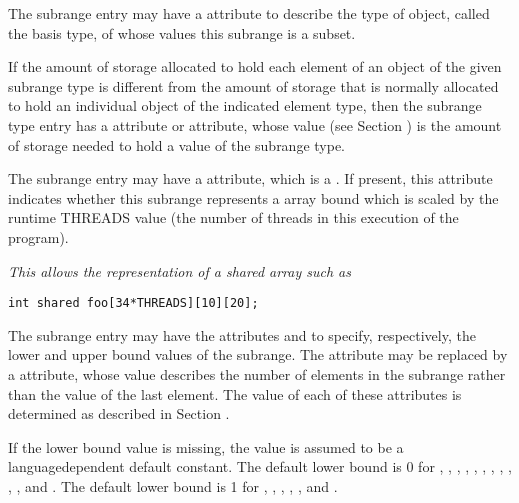 The subrange entry may have 
a \DWATtype{} attribute to describe
the type of object, called the basis type, of whose values
this subrange is a subset.

If the amount of storage allocated to hold each element of an
object of the given subrange type is different from the amount
of storage that is normally allocated to hold an individual
object of the indicated element type, then the subrange
type entry has a 
\DWATbytesize{} attribute or 
\DWATbitsize{}
attribute, whose value 
(see Section )
is the amount of
storage needed to hold a value of the subrange type.

The 
\hypertarget{chap:DWATthreadsscaledupcarrayboundthreadsscalfactor}{}
subrange entry may have 
a 
\DWATthreadsscaled{} attribute,
which is a . 
If present, this attribute indicates whether
this subrange represents a  array bound which is scaled
by the runtime THREADS value (the number of  threads in
this execution of the program).

\textit{This allows the representation of a  shared array such as}

\begin{lstlisting}[numbers=none]
int shared foo[34*THREADS][10][20];
\end{lstlisting}

The 
\hypertarget{chap:DWATlowerboundlowerboundofsubrange}{}
subrange 
\hypertarget{chap:DWATupperboundupperboundofsubrange}{}
entry may have the attributes 
\DWATlowerbound{}
and \DWATupperbound{}
 to specify, respectively, the lower
and upper bound values of the subrange. The 
\DWATupperbound{}
attribute 
\hypertarget{chap:DWATcountelementsofsubrangetype}{}
may 
be 
replaced by a 
\DWATcount{} attribute, 
whose
value describes the number of elements in the subrange rather
than the value of the last element. The value of each of
these attributes is determined as described in 
Section .

If the lower bound value is missing, the value is assumed to
be a language\dash dependent default constant. 
The default lower bound is 0 for 
, 
, 
,
,
, 
, 
, 
,
,
, 
, and 
. 
The default lower bound is 1 for 
, 
,
, 
,
,
 and 
.

